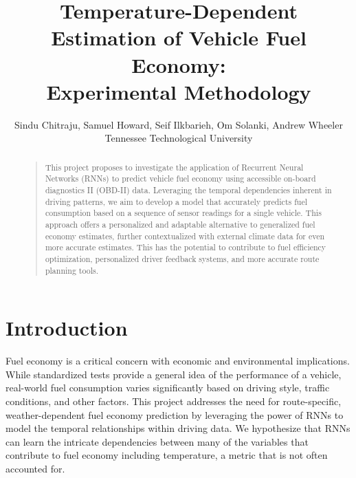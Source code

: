 \documentclass[letterpaper]{article}
\begin{document}

\nocopyright

\title{Temperature-Dependent Estimation of Vehicle Fuel Economy:\\Experimental Methodology}
\author{Sindu Chitraju, Samuel Howard, Seif Ilkbarieh, Om Solanki, Andrew Wheeler\\
Tennessee Technological University
}

\maketitle

\begin{abstract}
\begin{quote}
    This project proposes to investigate the application of Recurrent Neural Networks (RNNs) to predict vehicle fuel economy using accessible on-board diagnostics II (OBD-II) data. 
    Leveraging the temporal dependencies inherent in driving patterns, we aim to develop a model that accurately predicts fuel consumption based on a sequence of sensor readings for a single vehicle.
    This approach offers a personalized and adaptable alternative to generalized fuel economy estimates, further contextualized with external climate data for even more accurate estimates.
    This has the potential to contribute to fuel efficiency optimization, personalized driver feedback systems, and more accurate route planning tools. 
\end{quote}
\end{abstract}

\section{Introduction}

\noindent Fuel economy is a critical concern with economic and environmental implications. 
While standardized tests provide a general idea of the performance of a vehicle, 
real-world fuel consumption varies significantly based on driving style, traffic conditions, and other factors.
This project addresses the need for route-specific, weather-dependent fuel economy prediction by leveraging the power of RNNs to model the temporal relationships within driving data.
We hypothesize that RNNs can learn the intricate dependencies between many of the variables that contribute to fuel economy including temperature, a metric that is not often accounted for.
\end{document}
